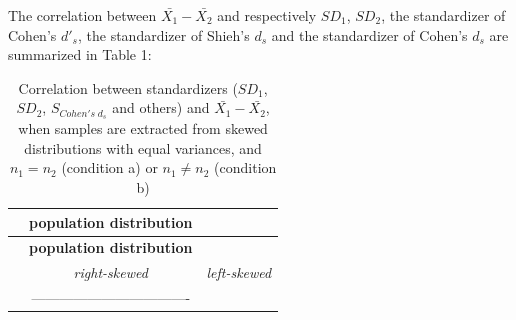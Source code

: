 \documentclass[
  man]{apa6}
\begin{document}
The correlation between \(\bar{X_1}-\bar{X_2}\) and respectively \(SD_1\), \(SD_2\), the standardizer of Cohen's \(d'_s\), the standardizer of Shieh's \(d_s\) and the standardizer of Cohen's \(d_s\) are summarized in Table 1:

\begin{longtable}[]{@{}lcc@{}}
\caption{Correlation between standardizers (\(SD_1\), \(SD_2\), \(S_{Cohen's \; d_s}\) and others) and \(\bar{X_1}-\bar{X_2}\), when samples are extracted from skewed distributions with equal variances, and \(n_1=n_2\) (condition a) or \(n_1 \neq n_2\) (condition b)}\tabularnewline
\toprule
\begin{minipage}[b]{0.27\columnwidth}\raggedright
\strut
\end{minipage} & \begin{minipage}[b]{0.29\columnwidth}\centering
\textbf{\textbf{population distribution}}\strut
\end{minipage} & \begin{minipage}[b]{0.35\columnwidth}\centering
\strut
\end{minipage}\tabularnewline
\midrule
\endfirsthead
\toprule
\begin{minipage}[b]{0.27\columnwidth}\raggedright
\strut
\end{minipage} & \begin{minipage}[b]{0.29\columnwidth}\centering
\textbf{\textbf{population distribution}}\strut
\end{minipage} & \begin{minipage}[b]{0.35\columnwidth}\centering
\strut
\end{minipage}\tabularnewline
\midrule
\endhead
\begin{minipage}[t]{0.27\columnwidth}\raggedright
\strut
\end{minipage} & \begin{minipage}[t]{0.29\columnwidth}\centering
\emph{right-skewed}\strut
\end{minipage} & \begin{minipage}[t]{0.35\columnwidth}\centering
\emph{left-skewed}\strut
\end{minipage}\tabularnewline
\begin{minipage}[t]{0.27\columnwidth}\raggedright
\strut
\end{minipage} & \begin{minipage}[t]{0.29\columnwidth}\centering
----------------------------------\strut
\end{minipage} & \begin{minipage}[t]{0.35\columnwidth}\centering

\end{minipage}
\end{longtable}
\end{document}
